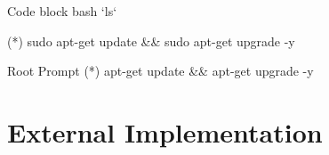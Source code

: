 \documentclass[11pt, a4paper]{article}
\begin{document}
\begin{codeblock}{Code block bash}
    `ls`
\end{codeblock}

\begin{terminal}{}
    (*\prompt*) sudo apt-get update && sudo apt-get upgrade -y
\end{terminal}

\begin{terminal}{Root Prompt}
    (*\rootprompt*) apt-get update && apt-get upgrade -y
\end{terminal}


\section{External Implementation}

\end{document}
